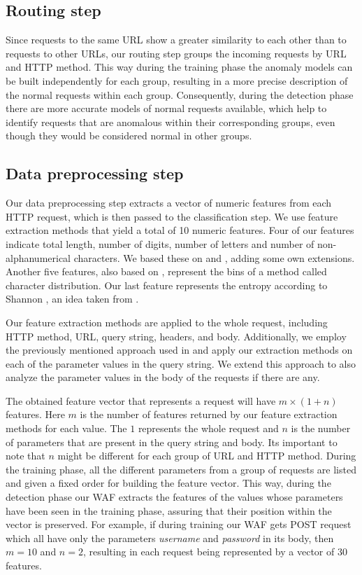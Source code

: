\subsection{Routing step}

Since requests to the same URL show a greater similarity to each other
than to requests to other URLs, our routing step groups the incoming
requests by URL and HTTP method. This way during the training phase the
anomaly models can be built independently for each group, resulting in a
more precise description of the normal requests within each group.
Consequently, during the detection phase there are more accurate models of
normal requests available, which help to identify requests that are
anomalous within their corresponding groups, even though they would be
considered normal in other groups.


\subsection{Data preprocessing step}

Our data preprocessing step extracts a vector of numeric features from
each HTTP request, which is then passed to the classification step.
We use feature extraction methods that yield a total of 10 numeric features.
Four of our features indicate total length, number of digits, number of
letters and number of non-alphanumerical characters. We based these
on \cite{kruegel2003anomaly} and \cite{nguyen2011application}, adding
some own extensions.
Another five features, also based on \cite{kruegel2003anomaly}, represent
the bins of a method called character distribution.
Our last feature represents the entropy according to Shannon
\cite{encyMathEntropy}, an idea taken from \cite{nguyen2011application}.

Our feature extraction methods are applied to the whole request,
including HTTP method, URL, query string, headers, and body.
Additionally, we employ the previously mentioned approach used in
\cite{kruegel2003anomaly} and apply our extraction methods on each of the
parameter values in the query string. We extend this approach to also
analyze the parameter values in the body of the requests if there are any.

The obtained feature vector that represents a request will have
$m \times (1 + n)$ features.
Here $m$ is the number of features returned by our feature extraction
methods for each value.
The $1$ represents the whole request and $n$ is the number of parameters
that are present in the query string and body.
Its important to note that $n$ might be different for each group of URL
and HTTP method.
During the training phase, all the different parameters from a group of
requests are listed and given a fixed order for building the feature vector.
This way, during the detection phase our WAF extracts the features of the
values whose parameters have been seen in the training phase, assuring that
their position within the vector is preserved.
For example, if during training our WAF gets POST request which all have
only the parameters \textit{username} and \textit{password} in its body,
then $m = 10$ and $n = 2$, resulting in each request being represented by
a vector of 30 features.

